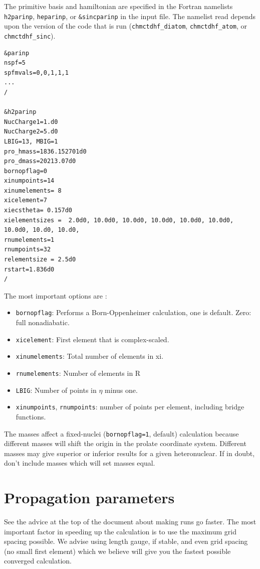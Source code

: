 \documentclass[10pt,leqno, oneside]{book}
\begin{document}
The primitive basis and hamiltonian are specified in the Fortran namelists \verb#h2parinp#, \verb#heparinp#, or \verb#&sincparinp# in the input file.
The namelist read depends upon the version of the code that is run (\verb#chmctdhf_diatom#, \verb#chmctdhf_atom#, or \verb#chmctdhf_sinc#).
{\footnotesize
\begin{verbatim}
&parinp
nspf=5
spfmvals=0,0,1,1,1
...
/

&h2parinp
NucCharge1=1.d0
NucCharge2=5.d0
LBIG=13, MBIG=1
pro_hmass=1836.152701d0
pro_dmass=20213.07d0
bornopflag=0
xinumpoints=14
xinumelements= 8
xicelement=7
xiecstheta= 0.157d0  
xielementsizes =  2.0d0, 10.0d0, 10.0d0, 10.0d0, 10.0d0, 10.0d0, 10.0d0, 10.d0, 10.d0, 
rnumelements=1
rnumpoints=32
relementsize = 2.5d0
rstart=1.836d0
/
\end{verbatim}}
The most important options  are :
\begin{itemize}
\item{\verb#bornopflag#:  Performs a Born-Oppenheimer calculation, one is default.  Zero: full nonadiabatic.}
\item{\verb#xicelement#: First element that is complex-scaled.}
\item{\verb#xinumelements#: Total number of elements in xi. }
\item{\verb#rnumelements#: Number of elements in R}
\item{\verb#LBIG#: Number of points in $\eta$ minus one.}
\item{\verb#xinumpoints#, \verb#rnumpoints#: number of points per element, including bridge functions.}
\end{itemize}
The masses affect a fixed-nuclei (\verb#bornopflag=1#, default) 
calculation because different masses will shift the origin in the prolate coordinate system.  
Different masses may give superior or inferior results for a given heteronuclear.  If in doubt, don't include masses which will set masses equal.


\section{Propagation parameters}

See the advice at the top of the document about making runs go faster.
The most important factor in speeding up the calculation is to use the maximum grid spacing possible.  We advise using
length gauge, if stable, and even grid spacing (no small first element) which we believe will give you the fastest possible 
converged calculation.
\end{document}
